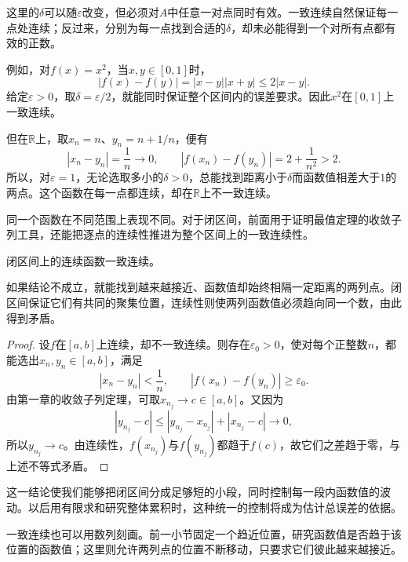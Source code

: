 这里的\(\delta\)可以随\(\varepsilon\)改变，但必须对\(A\)中任意一对点同时有效。一致连续自然保证每一点处连续；反过来，分别为每一点找到合适的\(\delta\)，却未必能得到一个对所有点都有效的正数。

例如，对\(f(x)=x^2\)，当\(x,y\in[0,1]\)时，
\begin{equation*}
 |f(x)-f(y)|=|x-y||x+y|\le2|x-y|.
\end{equation*}
给定\(\varepsilon>0\)，取\(\delta=\varepsilon/2\)，就能同时保证整个区间内的误差要求。因此\(x^2\)在\([0,1]\)上一致连续。

但在\(\mathbb R\)上，取\(x_n=n\)、\(y_n=n+1/n\)，便有
\begin{equation*}
 |x_n-y_n|=\frac1n\to0,\qquad
 |f(x_n)-f(y_n)|=2+\frac1{n^2}>2.
\end{equation*}
所以，对\(\varepsilon=1\)，无论选取多小的\(\delta>0\)，总能找到距离小于\(\delta\)而函数值相差大于\(1\)的两点。这个函数在每一点都连续，却在\(\mathbb R\)上不一致连续。

同一个函数在不同范围上表现不同。对于闭区间，前面用于证明最值定理的收敛子列工具，还能把逐点的连续性推进为整个区间上的一致连续性。

\begin{theorem}\label{thm:functions-uniform-continuity}
闭区间上的连续函数一致连续。
\end{theorem}

如果结论不成立，就能找到越来越接近、函数值却始终相隔一定距离的两列点。闭区间保证它们有共同的聚集位置，连续性则使两列函数值必须趋向同一个数，由此得到矛盾。

\newpage
\begin{proof}
设\(f\)在\([a,b]\)上连续，却不一致连续。则存在\(\varepsilon_0>0\)，使对每个正整数\(n\)，都能选出\(x_n,y_n\in[a,b]\)，满足
\begin{equation*}
 |x_n-y_n|<\frac1n,\qquad |f(x_n)-f(y_n)|\ge\varepsilon_0.
\end{equation*}
由第一章的收敛子列定理，可取\(x_{n_j}\to c\in[a,b]\)。又因为
\begin{equation*}
 |y_{n_j}-c|\le|y_{n_j}-x_{n_j}|+|x_{n_j}-c|\to0,
\end{equation*}
所以\(y_{n_j}\to c\)。由连续性，\(f(x_{n_j})\)与\(f(y_{n_j})\)都趋于\(f(c)\)，故它们之差趋于零，与上述不等式矛盾。
\end{proof}

这一结论使我们能够把闭区间分成足够短的小段，同时控制每一段内函数值的波动。以后用有限求和研究整体累积时，这种统一的控制将成为估计总误差的依据。

一致连续也可以用数列刻画。前一小节固定一个趋近位置，研究函数值是否趋于该位置的函数值；这里则允许两列点的位置不断移动，只要求它们彼此越来越接近。

